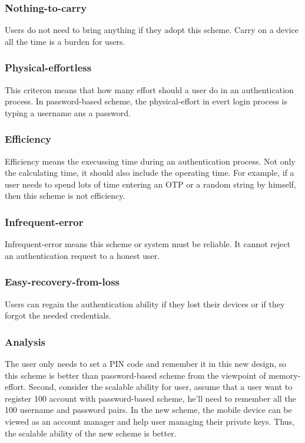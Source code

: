 \begin{CJK}{Bg5}{bsmi}
\subsubsection{Nothing-to-carry}

Users do not need to bring anything if they adopt this scheme. Carry on a device all the time is a burden for users.

\subsubsection{Physical-effortless}

This criteron means that how many effort should a user do in an authentication process. In password-based scheme, the physical-effort in evert login process is typing a username ans a password.

\subsubsection{Efficiency}

Efficiency means the execussing time during an authentication process. Not only the calculating time, it should also include the operating time. For example, if a user needs to spend lots of time entering an OTP or a random string by himself, then this scheme is not efficiency.

\subsubsection{Infrequent-error}

Infrequent-error means this scheme or system must be reliable. It cannot reject an authentication request to a honest user.

\subsubsection{Easy-recovery-from-loss}

Users can regain the authentication ability if they lost their devices or if they forgot the needed credentials.

\subsubsection{Analysis}

The user only needs to set a PIN code and remember it in this new design, so this scheme is better than password-based scheme from the viewpoint of memory-effort. Second, consider the scalable ability for user, assume that a user want to register 100 account with password-based scheme, he'll need to remember all the 100 username and password pairs. In the new scheme, the mobile device can be viewed as an account manager and help user managing their private keys. Thus, the scalable ability of the new scheme is better.


\end{CJK}
